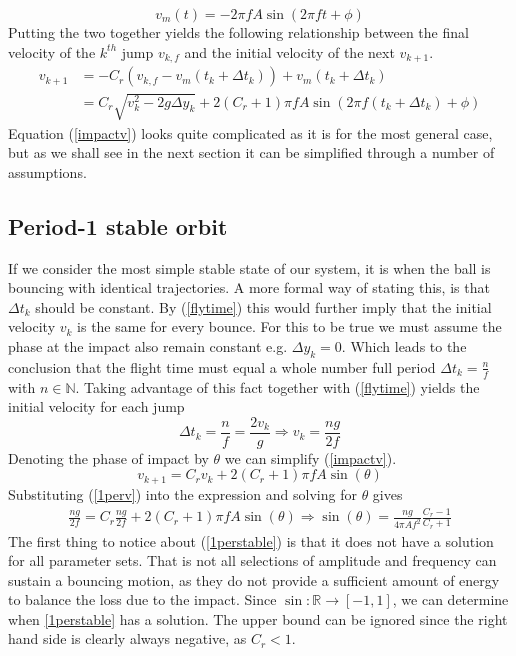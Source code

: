 \documentclass[12pt,oneside,a4paper]{article}
\numberwithin{equation}{section}
\begin{document}
{{{{\begin{equation}
	v_m(t) = -2\pi f A \sin(2\pi f t+ \phi)
	\label{membranev}
\end{equation}
Putting the two together yields the following relationship between the final velocity of the $k^{th}$ jump $v_{k,f}$ and the initial velocity of the next $v_{k+1}$.
\begin{align}
	v_{k+1} &= -C_r(v_{k,f}-v_m(t_k+\Delta t_k))+v_m(t_k+\Delta t_k) \nonumber \\
	&= C_r \sqrt{v_k^2-2g\Delta y_k}+2(C_r+1)\pi f A \sin(2\pi f (t_k+\Delta t_k)+ \phi) \label{impactv}
\end{align}
Equation (\ref{impactv}) looks quite complicated as it is for the most general case, but as we shall see in the next section it can be simplified through a number of assumptions.

\subsection{Period-1 stable orbit}
If we consider the most simple stable state of our system, it is when the ball is bouncing with identical trajectories. A more formal way of stating this, is that $\Delta t_k$ should be constant. By  (\ref{flytime}) this would further imply that the initial velocity $v_k$ is the same for every bounce. For this to be true we must assume the phase at the impact also remain constant e.g. $\Delta y_k=0$. Which leads to the conclusion that the flight time must equal a whole number full period $\Delta t_k = \frac{n}{f}$ with $n\in \mathbb{N}$. Taking advantage of this fact together with (\ref{flytime}) yields the initial velocity for each jump
\begin{equation}
	\Delta t_k = \frac{n}{f} = \frac{2v_k}{g} \Rightarrow v_k = \frac{ng}{2f}
	\label{1perv}
\end{equation}
Denoting the phase of impact by $\theta$ we can simplify (\ref{impactv}).
\begin{equation}
	v_{k+1} = C_rv_k+2(C_r+1)\pi fA \sin(\theta)
\end{equation}
Substituting (\ref{1perv}) into the expression and solving for $\theta$ gives
\begin{align}
	\frac{ng}{2f} = C_r\frac{ng}{2f}+2(C_r+1)\pi fA \sin(\theta) \Rightarrow \sin(\theta) = \frac{ng}{4\pi Af^2 }\frac{C_r-1}{C_r+1}
	\label{1perstable}
\end{align}
The first thing to notice about (\ref{1perstable}) is that it does not have a solution for all parameter sets. That is not all selections of amplitude and frequency can sustain a bouncing motion, as they do not provide a sufficient amount of energy to balance the loss due to the impact. Since $\sin: \mathbb{R} \rightarrow [-1,1]$, we can determine when \eqref{1perstable} has a solution. The upper bound can be  ignored since the right hand side is clearly always negative, as $C_r<1$.
}}}}
\end{document}
